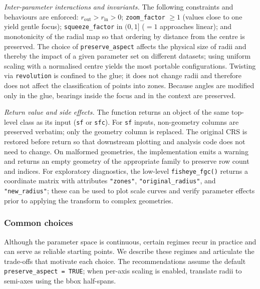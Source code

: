 \emph{Inter-parameter interactions and invariants.} The following constraints and behaviours are
enforced: \(r_{\text{out}} > r_{\text{in}} > 0\); \texttt{zoom\_factor} \(\ge 1\) (values close to one
yield gentle focus); \texttt{squeeze\_factor} in \((0,1]\) (\(=1\) approaches linear); and monotonicity of
the radial map so that ordering by distance from the centre is preserved. The choice of
\texttt{preserve\_aspect} affects the physical size of radii and thereby the impact of a given parameter
set on different datasets; using uniform scaling with a normalised centre yields the most portable
configurations. Twisting via \texttt{revolution} is confined to the glue; it does not change radii and
therefore does not affect the classification of points into zones. Because angles are modified only
in the glue, bearings inside the focus and in the context are preserved.

\emph{Return value and side effects.} The function returns an object of the same top-level class as
its input (\texttt{sf} or \texttt{sfc}). For \texttt{sf} inputs, non-geometry columns are preserved
verbatim; only the geometry column is replaced. The original CRS is restored before return so that
downstream plotting and analysis code does not need to change. On malformed geometries, the
implementation emits a warning and returns an empty geometry of the appropriate family to preserve
row count and indices. For exploratory diagnostics, the low-level \texttt{fisheye\_fgc()} returns a
coordinate matrix with attributes \texttt{"zones"}, \texttt{"original\_radius"}, and \texttt{"new\_radius"};
these can be used to plot scale curves and verify parameter effects prior to applying the transform
to complex geometries.

\subsubsection{Common choices}\label{common-choices}

Although the parameter space is continuous, certain regimes recur in practice and can serve as
reliable starting points. We describe these regimes and articulate the trade-offs that motivate each
choice. The recommendations assume the default \texttt{preserve\_aspect\ =\ TRUE}; when per-axis scaling is
enabled, translate radii to semi-axes using the bbox half-spans.

